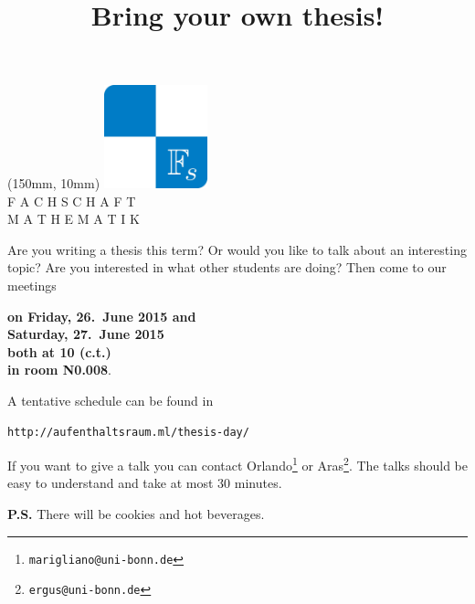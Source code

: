 \documentclass[21pt, a4paper, english]{scrartcl}
\title{\ \\ \large{Bring your own thesis!}}
\date{\vspace{-4cm}}
\begin{document}
\maketitle

\begin{textblock*}{50mm}(150mm, 10mm)
\includegraphics[width=30mm]{fs}\\
        \scriptsize
        F A C H S C H A F T\\
        M A T H E M A T I K
\end{textblock*}

Are you writing a thesis this term? Or would you like to talk about an
interesting topic? Are you interested in what other students are doing?
Then come to our meetings
\begin{center}
\textbf{on Friday, 26.\ June 2015 and \\ Saturday, 27.\ June 2015 \\
both at 10 (c.t.) \\ in room N0.008}.
\end{center}

A tentative schedule can be found in
\begin{center}
\texttt{http://aufenthaltsraum.ml/thesis-day/}
\end{center}

If you want to give a talk you can contact
Orlando\footnote{\texttt{marigliano@uni-bonn.de}} or
Aras\footnote{\texttt{ergus@uni-bonn.de}}. The talks should be easy to
understand and take at most 30 minutes.

\textbf{P.S.} There will be cookies and hot beverages.
\end{document}
